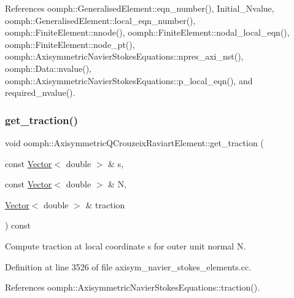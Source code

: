 References oomph\+::\+Generalised\+Element\+::eqn\+\_\+number(), Initial\+\_\+\+Nvalue, oomph\+::\+Generalised\+Element\+::local\+\_\+eqn\+\_\+number(), oomph\+::\+Finite\+Element\+::nnode(), oomph\+::\+Finite\+Element\+::nodal\+\_\+local\+\_\+eqn(), oomph\+::\+Finite\+Element\+::node\+\_\+pt(), oomph\+::\+Axisymmetric\+Navier\+Stokes\+Equations\+::npres\+\_\+axi\+\_\+nst(), oomph\+::\+Data\+::nvalue(), oomph\+::\+Axisymmetric\+Navier\+Stokes\+Equations\+::p\+\_\+local\+\_\+eqn(), and required\+\_\+nvalue().

\mbox{\label{classoomph_1_1AxisymmetricQCrouzeixRaviartElement_a60ea4ee3c006bc04984f1dcadb87a79d}} 
\subsubsection{\texorpdfstring{get\+\_\+traction()}{get\_traction()}}
{\footnotesize\ttfamily void oomph\+::\+Axisymmetric\+Q\+Crouzeix\+Raviart\+Element\+::get\+\_\+traction (\begin{DoxyParamCaption}\item[{const \hyperlink{classoomph_1_1Vector}{Vector}$<$ double $>$ \&}]{s,  }\item[{const \hyperlink{classoomph_1_1Vector}{Vector}$<$ double $>$ \&}]{N,  }\item[{\hyperlink{classoomph_1_1Vector}{Vector}$<$ double $>$ \&}]{traction }\end{DoxyParamCaption}) const}



Compute traction at local coordinate s for outer unit normal N. 



Definition at line 3526 of file axisym\+\_\+navier\+\_\+stokes\+\_\+elements.\+cc.



References oomph\+::\+Axisymmetric\+Navier\+Stokes\+Equations\+::traction().

\mbox{\label{classoomph_1_1AxisymmetricQCrouzeixRaviartElement_a85c8740ef4dd17626ae47c9344e15ae8}} 
